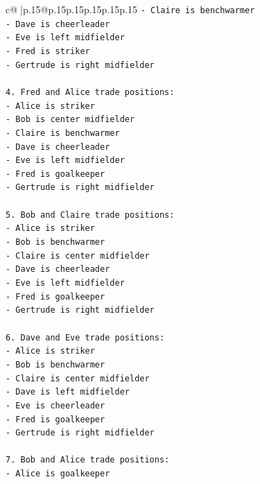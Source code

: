 \documentclass{article}
\begin{document}
{\begin{supertabular}{c@{$\;$}|p{.15\linewidth}@{}p{.15\linewidth}p{.15\linewidth}p{.15\linewidth}p{.15\linewidth}p{.15\linewidth}}
{{{\texttt{{-} Claire is benchwarmer} \\
\texttt{{-} Dave is cheerleader} \\
\texttt{{-} Eve is left midfielder} \\
\texttt{{-} Fred is striker} \\
\texttt{{-} Gertrude is right midfielder} \\
\\ 
\texttt{4. Fred and Alice trade positions:} \\
\texttt{{-} Alice is striker} \\
\texttt{{-} Bob is center midfielder} \\
\texttt{{-} Claire is benchwarmer} \\
\texttt{{-} Dave is cheerleader} \\
\texttt{{-} Eve is left midfielder} \\
\texttt{{-} Fred is goalkeeper} \\
\texttt{{-} Gertrude is right midfielder} \\
\\ 
\texttt{5. Bob and Claire trade positions:} \\
\texttt{{-} Alice is striker} \\
\texttt{{-} Bob is benchwarmer} \\
\texttt{{-} Claire is center midfielder} \\
\texttt{{-} Dave is cheerleader} \\
\texttt{{-} Eve is left midfielder} \\
\texttt{{-} Fred is goalkeeper} \\
\texttt{{-} Gertrude is right midfielder} \\
\\ 
\texttt{6. Dave and Eve trade positions:} \\
\texttt{{-} Alice is striker} \\
\texttt{{-} Bob is benchwarmer} \\
\texttt{{-} Claire is center midfielder} \\
\texttt{{-} Dave is left midfielder} \\
\texttt{{-} Eve is cheerleader} \\
\texttt{{-} Fred is goalkeeper} \\
\texttt{{-} Gertrude is right midfielder} \\
\\ 
\texttt{7. Bob and Alice trade positions:} \\
\texttt{{-} Alice is goalkeeper} \\
}}}
\end{supertabular}}
\end{document}
